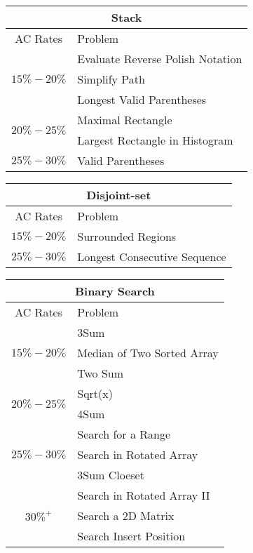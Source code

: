 \documentclass[paper=a4, fontsize=11pt]{scrartcl} %
\begin{document}
\begin{center}
  \vspace{20mm}

  \begin{tabular}{|c|l|}
      \hline
      \multicolumn{2}{|c|}{Stack} \\
      \hline
      AC Rates      &   Problem     \\
      \hline
      \multirow{3}{*}{$15\%-20\%$}  &    Evaluate Reverse Polish Notation    \\
          & Simplify Path    \\
          & Longest Valid Parentheses    \\
      \hline
      \multirow{2}{*}{$20\%-25\%$}  &   Maximal Rectangle    \\
          & Largest Rectangle in Histogram    \\
      \hline
      \multirow{1}{*}{$25\%-30\%$}  &   Valid Parentheses \\
      \hline
  \end{tabular}

  \vspace{20mm}

  \begin{tabular}{|c|l|}
      \hline
      \multicolumn{2}{|c|}{Disjoint-set} \\
      \hline
      AC Rates      &   Problem     \\
      \hline
      \multirow{1}{*}{$15\%-20\%$}  &    Surrounded Regions    \\
      \hline
      \multirow{1}{*}{$25\%-30\%$}  &   Longest Consecutive Sequence \\
      \hline
  \end{tabular}

  \begin{tabular}{|c|l|}
      \hline
      \multicolumn{2}{|c|}{Binary Search} \\
      \hline
      AC Rates      &   Problem     \\
      \hline
      \multirow{3}{*}{$15\%-20\%$}  &   3Sum\\
          & Median of Two Sorted Array  \\
          & Two Sum \\
      \hline
      \multirow{2}{*}{$20\%-25\%$}  &   Sqrt(x)    \\
          & 4Sum\\
      \hline
      \multirow{3}{*}{$25\%-30\%$}  &   Search for a Range\\
          & Search in Rotated Array\\
          & 3Sum Cloeset\\
      \hline
      \multirow{3}{*}{$30\%^+$}  &   Search in Rotated Array II \\
          & Search a 2D Matrix    \\
          & Search Insert Position  \\
      \hline
  \end{tabular}
  \pagebreak


\end{center}
\end{document}

